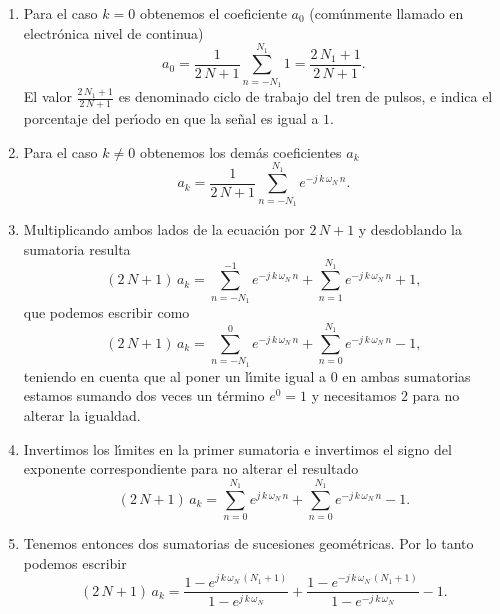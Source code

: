 \begin{enumerate}
\item   Para el caso $k=0$ obtenemos el coeficiente $a_{0}$ (com\'{u}nmente llamado en 
  electr\'{o}nica nivel de continua)
  \begin{equation}
    a_{0} = \frac{1}{2 \, N + 1} \sum_{n=-N_{1}}^{N_{1}} 1 = \frac{2 \, N_{1} + 1}{2 \, N + 1}.
  \end{equation}
  El valor  $\frac{2 \, N_{1} + 1}{2 \, N + 1}$ es denominado ciclo de trabajo del tren de pulsos, e indica
el porcentaje del per\'{\i}odo en que la se\~{n}al es igual a $1$.
        
\item   Para el caso $k \neq 0$ obtenemos los dem\'{a}s coeficientes $a_{k}$
  \begin{equation}
    a_{k}=  
    \frac{1}{2 \, N + 1} \sum_{n=-N_{1}}^{N_{1}} e^{-j \, k \, \omega_{N} \, n}.
  \end{equation}
  
\item   Multiplicando ambos lados de la ecuaci\'{o}n por $2 \, N + 1$ y desdoblando la sumatoria resulta
  \begin{equation}
    (2 \, N + 1) \, a_{k} =
    \sum_{n=-N_{1}}^{-1} e^{-j \, k \, \omega_{N} \, n} +
    \sum_{n=1}^{N_{1}} e^{-j \, k \, \omega_{N} \, n} + 1,
  \end{equation}
  que podemos escribir como
  \begin{equation}
    (2 \, N + 1) \, a_{k} =
    \sum_{n=-N_{1}}^{0} e^{-j \, k \, \omega_{N} \, n} +
    \sum_{n=0}^{N_{1}} e^{-j \, k \, \omega_{N} \, n} - 1,
  \end{equation}
  teniendo en cuenta  que al poner un l\'{\i}mite igual a $0$ en ambas 
  sumatorias  estamos sumando dos veces un t\'{e}rmino $e^{0} = 1$ y necesitamos
  $2$ para no alterar la igualdad.

\item   Invertimos los l\'{\i}mites en la primer sumatoria e invertimos el signo del exponente 
  correspondiente para no alterar el resultado
  \begin{equation}
    (2 \, N + 1) \, a_{k} =
    \sum_{n=0}^{N_{1}} e^{j \, k \, \omega_{N} \, n} +
    \sum_{n=0}^{N_{1}} e^{-j \, k \, \omega_{N} \, n} - 1.
  \end{equation}
        
\item   Tenemos entonces dos sumatorias de sucesiones geom\'{e}tricas. Por lo  tanto podemos  escribir
  \begin{equation}
    (2 \, N + 1) \, a_{k} =
    \frac{1 - e^{j \, k \, \omega_{N} \, (N_{1}+1)}}{1 - e^{j \, k \, \omega_{N}}}  +
    \frac{1 - e^{-j \, k \, \omega_{N} \, (N_{1}+1)}}{1 - e^{-j \, k \, \omega_{N}}}  -
    1. \label{ejemploTFTDinicial}
  \end{equation}
  

\end{enumerate}
